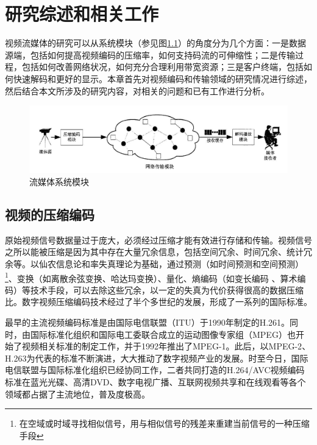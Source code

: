 \chapter{研究综述和相关工作}

视频流媒体的研究可以从系统模块（参见图\ref{fig:01}）的角度分为几个方面：一是数据源端，包括如何提高视频编码的压缩率，如何支持码流的可伸缩性；二是传输过程，包括如何改善网络状况，如何充分合理利用带宽资源；三是客户终端，包括如何快速解码和更好的显示。本章首先对视频编码和传输领域的研究情况进行综述，然后结合本文所涉及的研究内容，对相关的问题和已有工作进行分析。

\begin{figure}[h]
	\centering
	\includegraphics[width = 0.9\linewidth]{clip/01.png}
	\caption{流媒体系统模块 \label{fig:01}}
\end{figure}

\section{视频的压缩编码}

原始视频信号数据量过于庞大，必须经过压缩才能有效进行存储和传输。视频信号之所以能被压缩是因为其中存在大量冗余信息，包括空间冗余、时间冗余、统计冗余等\supercite{Gao-book-2010}。以仙农信息\supercite{Shannon-1948}论和率失真理论\supercite{Berger-book-1984}为基础，通过预测（如时间预测和空间预测）\footnote{在空域或时域寻找相似信号，用与相似信号的残差来重建当前信号的一种压缩手段}、变换（如离散余弦变换\supercite{Rao-1990}、哈达玛变换\supercite{Pratt-1969}）、量化\supercite{Gray-TIT1997}、熵编码（如变长编码\supercite{Huffman-1952} 、算术编码\supercite{Rissanen-1979}）等技术手段，可以去除这些冗余，以一定的失真为代价获得很高的数据压缩比。数字视频压缩编码技术经过了半个多世纪的发展，形成了一系列的国际标准。

最早的主流视频编码标准是由国际电信联盟（ITU）于1990年制定的H.261\supercite{H.261}。同时，由国际标准化组织和国际电工委联合成立的运动图像专家组（MPEG）也开始了视频相关标准的制定工作，并于1992年推出了MPEG-1\supercite{MPEG1}。此后，以MPEG-2\supercite{MPEG2}、H.263\supercite{H.263}为代表的标准不断演进，大大推动了数字视频产业的发展。时至今日，国际电信联盟与国际标准化组织已经协同工作，二者共同打造的H.264/AVC视频编码标准\supercite{H.264}在蓝光光碟、高清DVD、数字电视广播、互联网视频共享和在线观看等各个领域都占据了主流地位，普及度极高。

